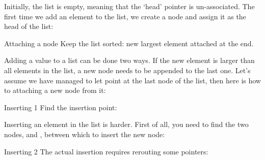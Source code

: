 Initially, the list is empty, meaning that the `head' pointer is
un-associated. The first time we add an element to the list, we create
a node and assign it as the head of the list:
%

\begin{block}{Attaching a node}
  Keep the list sorted: new largest element attached at the end.
  
\end{block}

Adding a value to a list can be done two ways. If the new element is
larger than all elements in the list, a new node needs to be appended
to the last one. Let's assume we have managed
to let  point at the last node of the list,
then here is how to 
attaching a new node from it:
%

\begin{block}{Inserting 1}
  Find the insertion point:
\end{block}

Inserting an element in the list is harder.
First of all, you need to find the two nodes,
 and , between which to insert the new node:
%

\begin{block}{Inserting 2}
  The actual insertion requires rerouting some pointers:
\end{block}
